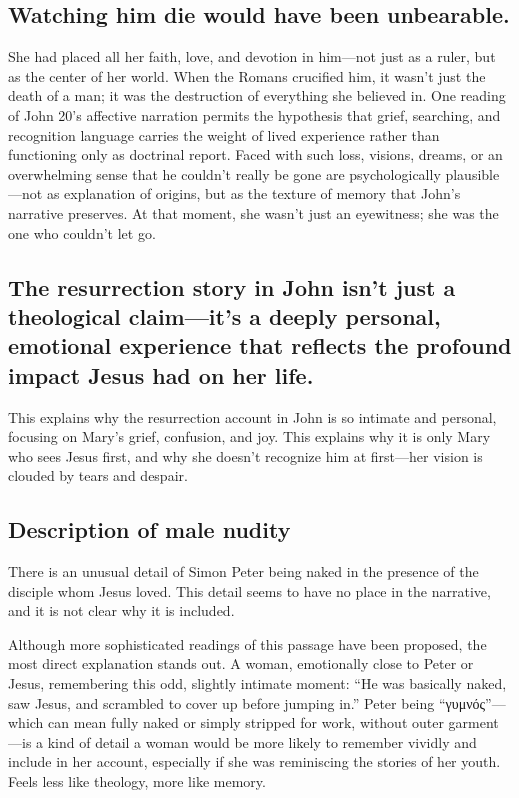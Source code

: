 \subsection{Watching him die would have been unbearable.}\label{subsec:watching-him-die-would-have-been-unbearable.}

She had placed all her faith, love, and devotion in him---not just as a ruler, but as the center of her world.
When the Romans crucified him, it wasn't just the death of a man; it was the destruction of everything she believed in.
One reading of John 20's affective narration permits the hypothesis that grief, searching, and recognition language carries the weight of lived experience rather than functioning only as doctrinal report.
Faced with such loss, visions, dreams, or an overwhelming sense that he couldn't really be gone are psychologically plausible---not as explanation of origins, but as the texture of memory that John's narrative preserves.
At that moment, she wasn't just an eyewitness; she was the one who couldn't let go.

\subsection{The resurrection story in John isn't just a theological claim---it's a deeply personal, emotional experience that reflects the profound impact Jesus had on her life.}\label{subsec:the-resurrection-story-in-john-isnt-just-a-theological-claimits-a-deeply-personal-emotional-experience-that-reflects-the-profound-impact-jesus-had-on-her-life.}

This explains why the resurrection account in John is so intimate and personal, focusing on Mary's grief, confusion, and joy.
This explains why it is only Mary who sees Jesus first, and why she doesn't recognize him at first---her vision is clouded by tears and despair.

\subsection{Description of male nudity}\label{subsec:description-of-male-nudity}

There is an unusual detail of Simon Peter being naked in the presence of the disciple whom Jesus loved.
This detail seems to have no place in the narrative, and it is not clear why it is included.

Although more sophisticated readings of this passage have been proposed, the most direct explanation stands out.
A woman, emotionally close to Peter or Jesus, remembering this odd, slightly intimate moment: ``He was basically naked, saw Jesus, and scrambled to cover up before jumping in.'' Peter being ``γυμνός''---which can mean fully naked or simply stripped for work, without outer garment---is a kind of detail a woman would be more likely to remember vividly and include in her account, especially if she was reminiscing the stories of her youth.
Feels less like theology, more like memory.

